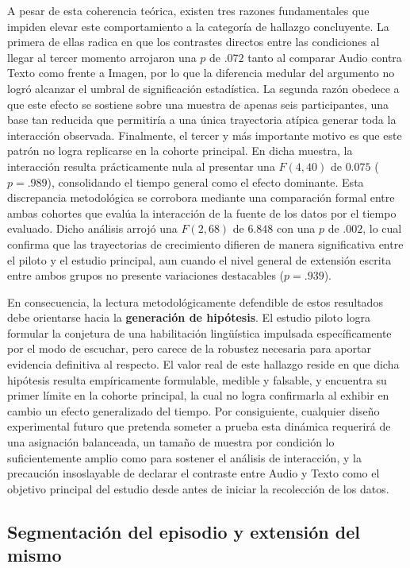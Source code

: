 \documentclass[12pt]{article}
\begin{document}
	A pesar de esta coherencia teórica, existen tres razones fundamentales que impiden elevar este comportamiento a la categoría de hallazgo concluyente. La primera de ellas radica en que los contrastes directos entre las condiciones al llegar al tercer momento arrojaron una $p$ de $.072$ tanto al comparar Audio contra Texto como frente a Imagen, por lo que la diferencia medular del argumento no logró alcanzar el umbral de significación estadística. La segunda razón obedece a que este efecto se sostiene sobre una muestra de apenas seis participantes, una base tan reducida que permitiría a una única trayectoria atípica generar toda la interacción observada. Finalmente, el tercer y más importante motivo es que este patrón no logra replicarse en la cohorte principal. En dicha muestra, la interacción resulta prácticamente nula al presentar una $F(4,40)$ de $0.075$ ($p = .989$), consolidando el tiempo general como el efecto dominante. Esta discrepancia metodológica se corrobora mediante una comparación formal entre ambas cohortes que evalúa la interacción de la fuente de los datos por el tiempo evaluado. Dicho análisis arrojó una $F(2,68)$ de $6.848$ con una $p$ de $.002$, lo cual confirma que las trayectorias de crecimiento difieren de manera significativa entre el piloto y el estudio principal, aun cuando el nivel general de extensión escrita entre ambos grupos no presente variaciones destacables ($p = .939$).
	
	En consecuencia, la lectura metodológicamente defendible de estos resultados debe orientarse hacia la \textbf{generación de hipótesis}. El estudio piloto logra formular la conjetura de una habilitación lingüística impulsada específicamente por el modo de escuchar, pero carece de la robustez necesaria para aportar evidencia definitiva al respecto. El valor real de este hallazgo reside en que dicha hipótesis resulta empíricamente formulable, medible y falsable, y encuentra su primer límite en la cohorte principal, la cual no logra confirmarla al exhibir en cambio un efecto generalizado del tiempo. Por consiguiente, cualquier diseño experimental futuro que pretenda someter a prueba esta dinámica requerirá de una asignación balanceada, un tamaño de muestra por condición lo suficientemente amplio como para sostener el análisis de interacción, y la precaución insoslayable de declarar el contraste entre Audio y Texto como el objetivo principal del estudio desde antes de iniciar la recolección de los datos.
	
	\subsection{Segmentación del episodio y extensión del mismo}
	
\end{document}

